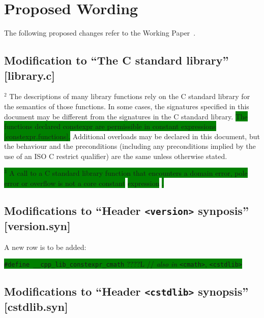 \documentclass[prd,twocolumn,amsmath,amssymb,nofootinbib,eqsecnum]{revtex4-1}
\newcommand{\code}[1]{{\tt #1}}
\newcommand{\header}[1]{{\tt <#1>}}
\newcommand{\highlight}[1]{\colorbox{green}{\!\!\!\! #1}}
\begin{document}
\newpage

\onecolumngrid

\section{Proposed Wording}

\setlength{\parindent}{0pt}


The following proposed changes refer to the Working Paper~\cite{WorkingPaper}.

\subsection{Modification to ``The C standard library'' [library.c]}

\hspace{-2.5ex} $^2$ The descriptions of many library functions rely on the C standard library for the semantics of those functions.
In some cases, the signatures specified in this document may be different from the signatures in the C
standard library. 
\highlight{The functions declared constexpr are permissible in constant expressions [constexpr.functions].}
Additional overloads may be declared in this document, but the behaviour and the
preconditions (including any preconditions implied by the use of an ISO C restrict qualifier) are the same
unless otherwise stated.

\vspace{1ex}

\highlight{\hspace{-2.5ex} $^3$ A call to a C standard library function that encounters a domain error, pole error or overflow is not a core constant}
\highlight{expression}
\highlight{[expr.const].}


\subsection{Modifications to ``Header \header{version} synposis'' [version.syn]}

A new row is to be added:

\vspace{1ex}

\highlight{
	\code{\#define \_\_cpp\_lib\_constexpr\_cmath} \qquad \qquad 20????L
	\qquad \qquad // {\it also in} \header{cmath}, \header{cstdlib}
}



\subsection{Modifications to ``Header \header{cstdlib} synopsis'' [cstdlib.syn]}
\end{document}
